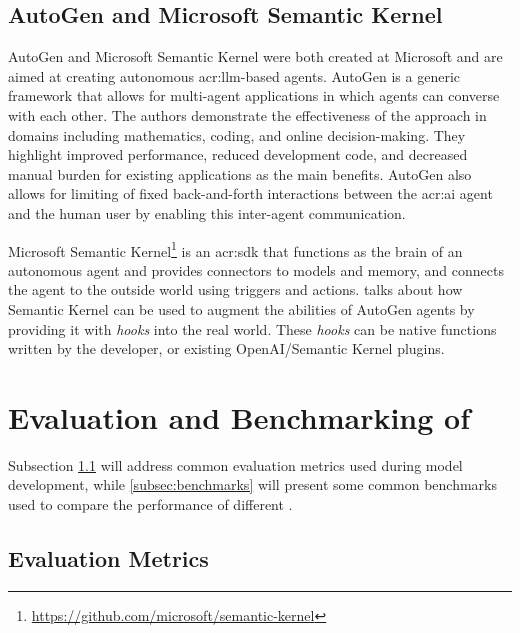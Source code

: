 \subsection{AutoGen and Microsoft Semantic Kernel}\label{subsubsec:microsoft-semantic-kernel}

AutoGen and Microsoft Semantic Kernel were both created at Microsoft and are aimed at creating autonomous \acrshort{acr:llm}-based agents. AutoGen \citep{wuAutoGenEnablingNextGen2023} is a generic framework that allows for multi-agent applications in which agents can converse with each other. The authors demonstrate the effectiveness of the approach in domains including mathematics, coding, and online decision-making. They highlight improved performance, reduced development code, and decreased manual burden for existing applications as the main benefits. AutoGen also allows for limiting of fixed back-and-forth interactions between the \acrshort{acr:ai} agent and the human user by enabling this inter-agent communication.

Microsoft Semantic Kernel\footnote{\url{https://github.com/microsoft/semantic-kernel}} is an \acrshort{acr:sdk} that functions as the brain of an autonomous agent and provides connectors to models and memory, and connects the agent to the outside world using triggers and actions. \cite{maedaAutoGenAgentsMeet2023} talks about how Semantic Kernel can be used to augment the abilities of AutoGen agents by providing it with \textit{hooks} into the real world. These \textit{hooks} can be native functions written by the developer, or existing OpenAI/Semantic Kernel plugins.



\section[Evaluation and Benchmarking of LLMs]{Evaluation and Benchmarking of }\label{sec:benchmarking-and-evaluation}

Subsection \ref{subsec:evaluation-metrics} will address common evaluation metrics used during model development, while \autoref{subsec:benchmarks} will present some common benchmarks used to compare the performance of different .

\subsection{Evaluation Metrics}\label{subsec:evaluation-metrics}


